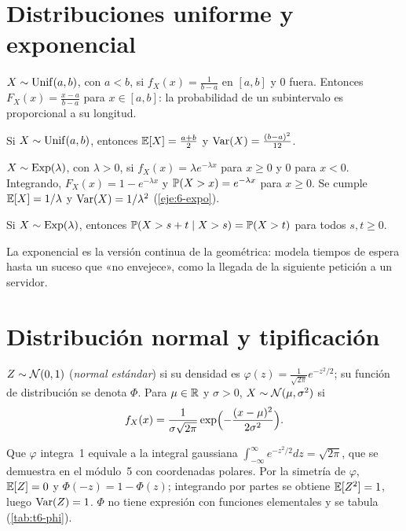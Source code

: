 \section{Distribuciones uniforme y exponencial}

\begin{definicion}[Uniforme]
$X\sim\operatorname{Unif}(a,b)$, con $a<b$, si $f_X(x)=\frac{1}{b-a}$ en $[a,b]$ y $0$ fuera. Entonces $F_X(x)=\frac{x-a}{b-a}$ para $x\in[a,b]$: la probabilidad de un subintervalo es proporcional a su longitud.
\end{definicion}

\begin{proposicion}\label{prop:t6-unif}
Si $X\sim\operatorname{Unif}(a,b)$, entonces $\mathbb{E}[X]=\frac{a+b}{2}$ y $\operatorname{Var}(X)=\frac{(b-a)^{2}}{12}$.
\end{proposicion}

\begin{definicion}[Exponencial]
$X\sim\operatorname{Exp}(\lambda)$, con $\lambda>0$, si $f_X(x)=\lambda e^{-\lambda x}$ para $x\ge0$ y $0$ para $x<0$. Integrando, $F_X(x)=1-e^{-\lambda x}$ y $\mathbb{P}(X>x)=e^{-\lambda x}$ para $x\ge0$. Se cumple $\mathbb{E}[X]=1/\lambda$ y $\operatorname{Var}(X)=1/\lambda^{2}$ (\cref{eje:6-expo}).
\end{definicion}

\begin{proposicion}\label{prop:t6-memoria}
Si $X\sim\operatorname{Exp}(\lambda)$, entonces $\mathbb{P}(X>s+t\mid X>s)=\mathbb{P}(X>t)$ para todos $s,t\ge0$.
\end{proposicion}

La exponencial es la versión continua de la geométrica: modela tiempos de espera hasta un suceso que «no envejece», como la llegada de la siguiente petición a un servidor.

\section{Distribución normal y tipificación}

\begin{definicion}[Normal]
$Z\sim\mathcal{N}(0,1)$ (\emph{normal estándar}) si su densidad es $\varphi(z)=\frac{1}{\sqrt{2\pi}}e^{-z^{2}/2}$; su función de distribución se denota $\Phi$. Para $\mu\in\mathbb{R}$ y $\sigma>0$, $X\sim\mathcal{N}(\mu,\sigma^{2})$ si
\[
f_X(x)=\frac{1}{\sigma\sqrt{2\pi}}\exp\Bigl(-\frac{(x-\mu)^{2}}{2\sigma^{2}}\Bigr).
\]
\end{definicion}

Que $\varphi$ integra~1 equivale a la integral gaussiana $\int_{-\infty}^{\infty}e^{-z^{2}/2}dz=\sqrt{2\pi}$, que se demuestra en el módulo~5 con coordenadas polares. Por la simetría de $\varphi$, $\mathbb{E}[Z]=0$ y $\Phi(-z)=1-\Phi(z)$; integrando por partes se obtiene $\mathbb{E}[Z^{2}]=1$, luego $\operatorname{Var}(Z)=1$. $\Phi$ no tiene expresión con funciones elementales y se tabula (\cref{tab:t6-phi}).

